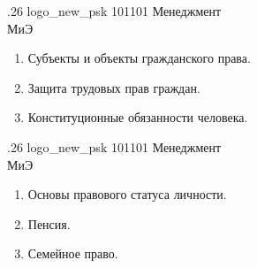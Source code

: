 \documentclass[
	12pt,
	a4paper,
	]
	{article}
\newcommand{\shapkFull}{
	\shapk
		{.26}
		{logo_new_psk}
		{101101}
		{Менеджмент\\}
		{МиЭ}
		{}
}
\begin{document}
\newpage


\shapkFull
\setcounter{zad}{0}

\begin{enumerate}
	\item Субъекты и объекты гражданского права.

	\item Защита трудовых прав граждан.

	\item Конституционные обязанности человека.

\end{enumerate}

\newpage


\shapkFull
\setcounter{zad}{0}

\begin{enumerate}
	\item Основы правового статуса личности.

	\item Пенсия.

	\item Семейное право.
\end{enumerate}

\newpage
\end{document}
